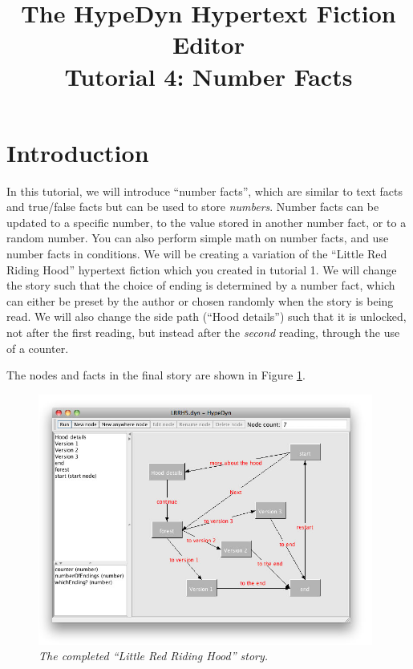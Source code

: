 \documentclass{article}
\begin{document}
\title{The HypeDyn Hypertext Fiction Editor\\Tutorial 4: Number Facts}
\date{}

\onecolumn
\maketitle

\tableofcontents

\section{Introduction}
In this tutorial, we will introduce ``number facts'', which are similar to text
facts and true\slash false facts but can be used to store \textit{numbers}.
Number facts can be updated to a specific number, to the value stored in another
number fact, or to a random number. You can also perform simple math on number
facts, and use number facts in conditions. We will be creating a variation of
the ``Little Red Riding Hood'' hypertext fiction which you created in tutorial
1. We will change the story such that the choice of ending is determined by a
number fact, which can either be preset by the author or chosen randomly when
the story is being read. We will also change the side path (``Hood details'')
such that it is unlocked, not after the first reading, but instead after the
\textit{second} reading, through the use of a counter.


The nodes and facts in the final story are shown in Figure
\ref{fig:tut3:completed}.

\begin{figure}[h]
  \centering
  \includegraphics[width=11cm]{images/hypedyn-tutorial-4-figure-1}
  \caption{\textit{The completed ``Little Red Riding Hood'' story.}}
  \label{fig:tut3:completed}
\end{figure} 
\end{document}

